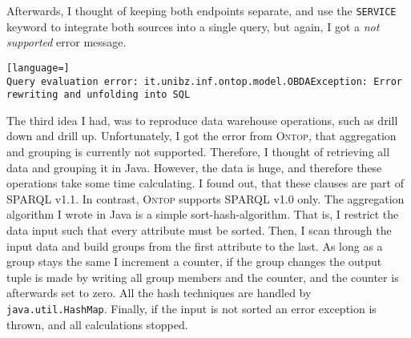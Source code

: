 Afterwards, I thought of keeping both endpoints separate, and use the \texttt{SERVICE} keyword to integrate both sources into a single query, but again, I got a \textit{not supported} error message.
\begin{lstlisting}[language=]
Query evaluation error: it.unibz.inf.ontop.model.OBDAException: Error rewriting and unfolding into SQL 
\end{lstlisting}

The third idea I had, was to reproduce data warehouse operations, such as drill down and drill up. Unfortunately, I got the error from \textsc{Ontop}, that aggregation and grouping is currently not supported. Therefore, I thought of retrieving all data and grouping it in Java. However, the data is huge, and therefore these operations take some time calculating. I found out, that these clauses are part of SPARQL v1.1. In contrast, \textsc{Ontop} supports SPARQL v1.0 only. The aggregation algorithm I wrote in Java is a simple sort-hash-algorithm. That is, I restrict the data input such that every attribute must be sorted. Then, I scan through the input data and build groups from the first attribute to the last. As long as a group stays the same I increment a counter, if the group changes the output tuple is made by writing all group members and the counter, and the counter is afterwards set to zero. All the hash techniques are handled by \texttt{java.util.HashMap}. Finally, if the input is not sorted an error exception is thrown, and all calculations stopped.
